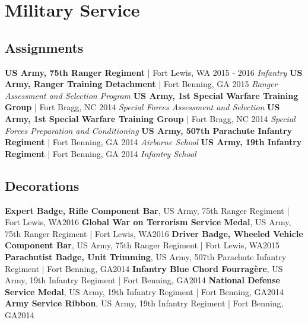 \documentclass{article}
\begin{document}
    \section*{Military Service}
    \subsection*{Assignments}
        \textbf{US Army, 75th Ranger Regiment} | Fort Lewis, WA \hfill{2015 - 2016}\newline
        \textit{Infantry}\newline\newline
        \textbf{US Army, Ranger Training Detachment} | Fort Benning, GA \hfill{2015}\newline
        \textit{Ranger Assessment and Selection Program}\newline\newline
        \textbf{US Army, 1st Special Warfare Training Group} | Fort Bragg, NC \hfill{2014}\newline
        \textit{Special Forces Assessment and Selection}\newline\newline
        \textbf{US Army, 1st Special Warfare Training Group} | Fort Bragg, NC \hfill{2014}\newline
        \textit{Special Forces Preparation and Conditioning}\newline\newline
        \textbf{US Army, 507th Parachute Infantry Regiment} | Fort Benning, GA \hfill{2014}\newline
        \textit{Airborne School}\newline\newline
        \textbf{US Army, 19th Infantry Regiment} | Fort Benning, GA \hfill{2014}\newline
        \textit{Infantry School}
    \subsection*{Decorations}
        \textbf{Expert Badge, Rifle Component Bar}, US Army, 75th Ranger Regiment | Fort Lewis, WA\hfill{2016}\newline
        \textbf{Global War on Terrorism Service Medal}, US Army, 75th Ranger Regiment | Fort Lewis, WA\hfill{2016}\newline
        \textbf{Driver Badge, Wheeled Vehicle Component Bar}, US Army, 75th Ranger Regiment | Fort Lewis, WA\hfill{2015}\newline
        \textbf{Parachutist Badge, Unit Trimming}, US Army, 507th Parachute Infantry Regiment | Fort Benning, GA\hfill{2014}\newline
        \textbf{Infantry Blue Chord Fourragère}, US Army, 19th Infantry Regiment | Fort Benning, GA\hfill{2014}\newline
        \textbf{National Defense Service Medal}, US Army, 19th Infantry Regiment | Fort Benning, GA\hfill{2014}\newline
        \textbf{Army Service Ribbon}, US Army, 19th Infantry Regiment | Fort Benning, GA\hfill{2014}
\end{document}
